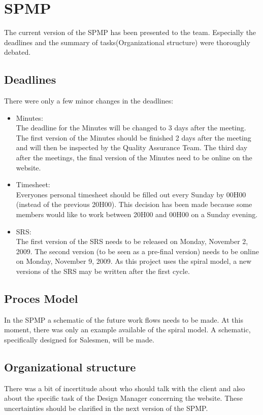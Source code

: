 \documentclass[a4paper, 12pt]{article}
\begin{document}
	\section{SPMP}
The current version of the SPMP has been presented to the team. Especially the deadlines and the summary of tasks(Organizational structure) were thoroughly debated. 
	 \subsection{Deadlines}
There were only a few minor changes in the deadlines:
	\begin{itemize}
		\item Minutes:\\
The deadline for the Minutes will be changed to 3 days after the meeting. The first version of the Minutes should be finished 2 days after the meeting and will then be inspected by the Quality Assurance Team. The third day after the meetings, the final version of the Minutes need to be online on the website.
		\item Timesheet:\\
Everyones personal timesheet should be filled out every Sunday by 00H00 (instead of the previous 20H00). This decision has been made because some members would like to work between 20H00 and 00H00 on a Sunday evening.
		\item SRS:\\
The first version of the SRS needs to be released on Monday, November 2, 2009. The second version (to be seen as a pre-final version) needs to be online on Monday, November 9, 2009. As this project uses the spiral model, a new versions of the SRS may be written after the first cycle.
	\end{itemize}	
	\subsection{Proces Model}
In the SPMP a schematic of the future work flows needs to be made. At this moment, there was only an example available of the spiral model. A schematic, specifically designed for Salesmen, will be made.
	\subsection{Organizational structure}
There was a bit of incertitude about who should talk with the client and also about the specific task of the Design Manager concerning the website. These uncertainties should be clarified in the next version of the SPMP.
\end{document}

